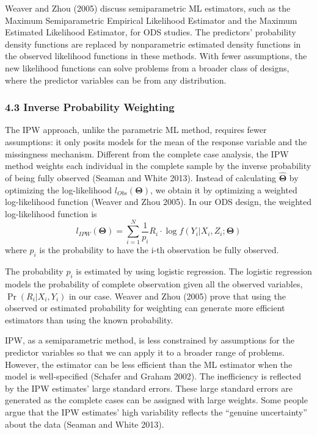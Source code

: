 \documentclass[
  12pt,
]{article}
\begin{document}
Weaver and Zhou (2005) discuss semiparametric ML estimators, such as the
Maximum Semiparametric Empirical Likelihood Estimator and the Maximum
Estimated Likelihood Estimator, for ODS studies. The predictors'
probability density functions are replaced by nonparametric estimated
density functions in the observed likelihood functions in these methods.
With fewer assumptions, the new likelihood functions can solve problems
from a broader class of designs, where the predictor variables can be
from any distribution.

\hypertarget{inverse-probability-weighting}{%
\subsubsection{4.3 Inverse Probability
Weighting}\label{inverse-probability-weighting}}

The IPW approach, unlike the parametric ML method, requires fewer
assumptions: it only posits models for the mean of the response variable
and the missingness mechanism. Different from the complete case
analysis, the IPW method weights each individual in the complete sample
by the inverse probability of being fully observed (Seaman and White
2013). Instead of calculating \(\hat{\boldsymbol{\Theta}}\) by
optimizing the log-likelihood \(l_{Obs}(\boldsymbol{\Theta})\), we
obtain it by optimizing a weighted log-likelihood function (Weaver and
Zhou 2005). In our ODS design, the weighted log-likelihood function is
\[
l_{IPW}(\boldsymbol{\Theta}) = \sum_{i = 1}^{N} \frac{1}{p_i}R_i\cdot \log f(Y_i |X_i, Z_i; \boldsymbol\Theta)
\] where \(p_i\) is the probability to have the i-th observation be
fully observed.

The probability \(p_i\) is estimated by using logistic regression. The
logistic regression models the probability of complete observation given
all the observed variables, \(\Pr(R_i | X_i, Y_i)\) in our case. Weaver
and Zhou (2005) prove that using the observed or estimated probability
for weighting can generate more efficient estimators than using the
known probability.

IPW, as a semiparametric method, is less constrained by assumptions for
the predictor variables so that we can apply it to a broader range of
problems. However, the estimator can be less efficient than the ML
estimator when the model is well-specified (Schafer and Graham 2002).
The inefficiency is reflected by the IPW estimates' large standard
errors. These large standard errors are generated as the complete cases
can be assigned with large weights. Some people argue that the IPW
estimates' high variability reflects the ``genuine uncertainty'' about
the data (Seaman and White 2013).
\end{document}
